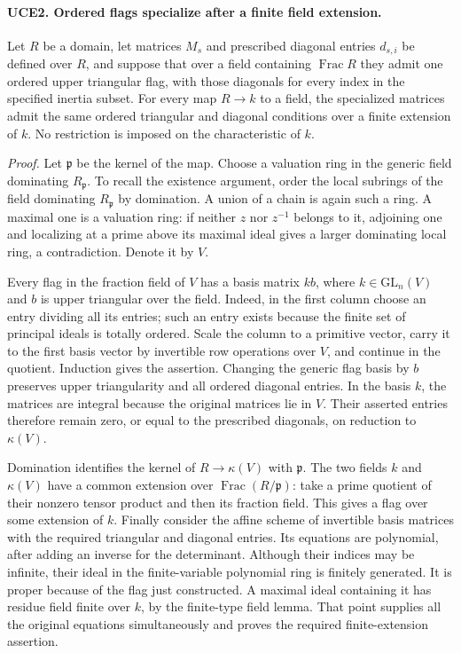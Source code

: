\paragraph{UCE2. Ordered flags specialize after a finite field extension.}
\label{claim:UCE2}
Let \(R\) be a domain, let matrices \(M_s\) and prescribed diagonal
entries \(d_{s,i}\) be defined over \(R\), and suppose that over a
field containing \(\operatorname{Frac}R\) they admit one ordered
upper triangular flag, with those diagonals for every index in the
specified inertia subset.  For every map \(R\to k\) to a field,
the specialized matrices admit the same ordered triangular and
diagonal conditions over a finite extension of \(k\).
No restriction is imposed on the characteristic of \(k\).

\emph{Proof.}
Let \(\mathfrak p\) be the kernel of the map.  Choose a valuation
ring in the generic field dominating \(R_{\mathfrak p}\).
To recall the existence argument, order the local subrings of the
field dominating \(R_{\mathfrak p}\) by domination.  A union of a
chain is again such a ring.  A maximal one is a valuation ring:
if neither \(z\) nor \(z^{-1}\) belongs to it, adjoining one and
localizing at a prime above its maximal ideal gives a larger
dominating local ring, a contradiction.  Denote it by \(V\).

Every flag in the fraction field of \(V\) has a basis matrix
\(k b\), where \(k\in\mathrm{GL}_n(V)\) and \(b\) is upper
triangular over the field.  Indeed, in the first column choose an
entry dividing all its entries; such an entry exists because the
finite set of principal ideals is totally ordered.  Scale the
column to a primitive vector, carry it to the first basis vector by
invertible row operations over \(V\), and continue in the quotient.
Induction gives the assertion.  Changing the generic flag basis by
\(b\) preserves upper triangularity and all ordered diagonal entries.
In the basis \(k\), the matrices are integral because the original
matrices lie in \(V\).  Their asserted entries therefore remain zero,
or equal to the prescribed diagonals, on reduction to \(\kappa(V)\).

Domination identifies the kernel of \(R\to\kappa(V)\) with
\(\mathfrak p\).  The two fields \(k\) and \(\kappa(V)\) have a
common extension over \(\operatorname{Frac}(R/\mathfrak p)\): take
a prime quotient of their nonzero tensor product and then its
fraction field.  This gives a flag over some extension of \(k\).
Finally consider the affine scheme of invertible basis matrices
with the required triangular and diagonal entries.  Its equations
are polynomial, after adding an inverse for the determinant.
Although their indices may be infinite, their ideal in the
finite-variable polynomial ring is finitely generated.  It is proper
because of the flag just constructed.  A maximal ideal containing it
has residue field finite over \(k\), by the finite-type field lemma.
That point supplies all the original equations simultaneously and
proves the required finite-extension assertion.

